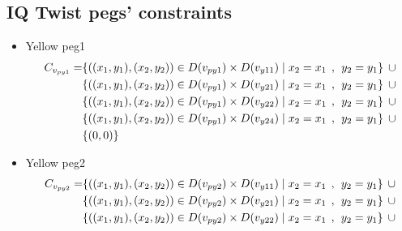 \begin{appendices}
\section{IQ Twist pegs' constraints}
\label{appendix:2Dpegs}
\begin{itemize}
  \item Yellow peg1\\
  \begin{align*}  
C_{v_{py1}} = &\{((x_{1},y_{1}),(x_{2},y_{2}))\in D(v_{py1}) \times D(v_{y11})\mid x_{2} = x_{1} \hspace{1ex} , \hspace{1ex}  y_{2} = y_{1}\}\hspace{1ex} \cup  
\\&\{((x_{1},y_{1}),(x_{2},y_{2}))\in D(v_{py1}) \times D(v_{y21})\mid x_{2} = x_{1} \hspace{1ex} , \hspace{1ex}  y_{2} = y_{1}\}\hspace{1ex} \cup 
\\&\{ ((x_{1},y_{1}),(x_{2},y_{2}))\in D(v_{py1}) \times D(v_{y22})\mid x_{2} = x_{1} \hspace{1ex} , \hspace{1ex}  y_{2} = y_{1}\}\hspace{1ex}\cup 
\\& \{((x_{1},y_{1}),(x_{2},y_{2}))\in D(v_{py1}) \times D(v_{y24})\mid x_{2} = x_{1} \hspace{1ex} , \hspace{1ex}  y_{2} = y_{1}\} \hspace{1ex}\cup
\\& \{(0,0)\}
\end{align*}
  \item Yellow peg2\\
  \begin{align*}
\Constraint{py2} = &\{((x_{1},y_{1}),(x_{2},y_{2}))\in \Domain{py2} \times \Domain{y11}\mid x_{2} = x_{1} \hspace{1ex} , \hspace{1ex}  y_{2} = y_{1}\} \hspace{1ex} \cup 
\\& \{((x_{1},y_{1}),(x_{2},y_{2}))\in \Domain{py2} \times \Domain{y21}\mid x_{2} = x_{1} \hspace{1ex} , \hspace{1ex}  y_{2} = y_{1}\} \hspace{1ex} \cup 
\\& \{ ((x_{1},y_{1}),(x_{2},y_{2}))\in \Domain{py2} \times \Domain{y22}\mid x_{2} = x_{1} \hspace{1ex} , \hspace{1ex}  y_{2} = y_{1}\} \hspace{1ex} \cup 

\end{align*}
\end{itemize}
\end{appendices}

